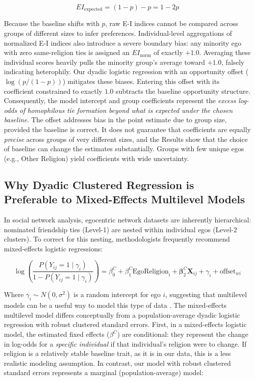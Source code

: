 \documentclass[11pt]{article}
\begin{document}
\begin{equation}
EI_{\text{expected}} = (1 - p) - p = 1 - 2p
\end{equation}

Because the baseline shifts with $p$, raw E-I indices cannot be compared across groups of different sizes to infer preferences. Individual-level aggregations of normalized E-I indices also introduce a severe boundary bias: any minority ego with zero same-religion ties is assigned an $EI_{\text{norm}}$ of exactly $+1.0$. Averaging these individual scores heavily pulls the minority group's average toward $+1.0$, falsely indicating heterophily. Our dyadic logistic regression with an opportunity offset ($\log(p/(1-p))$) mitigates these biases. Entering this offset with its coefficient constrained to exactly $1.0$ subtracts the baseline opportunity structure. Consequently, the model intercept and group coefficients represent the \textit{excess log-odds of homophilous tie formation beyond what is expected under the chosen baseline}. The offset addresses bias in the point estimate due to group size, provided the baseline is correct. It does not guarantee that coefficients are equally \textit{precise} across groups of very different sizes, and the Results show that the choice of baseline can change the estimates substantially. Groups with few unique egos (e.g., Other Religion) yield coefficients with wide uncertainty.

\subsection{Why Dyadic Clustered Regression is Preferable to Mixed-Effects Multilevel Models}

In social network analysis, egocentric network datasets are inherently hierarchical: nominated friendship ties (Level-1) are nested within individual egos (Level-2 clusters). To correct for this nesting, methodologists frequently recommend mixed-effects logistic regressions:

\begin{equation}
\log\left(\frac{P(Y_{ij} = 1 \mid \gamma_i)}{1 - P(Y_{ij} = 1 \mid \gamma_i)}\right) = \beta_0^C + \beta_1^C \text{EgoReligion}_i + \mathbf{\beta}_2^C \mathbf{X}_{ij} + \gamma_i + \text{offset}_{wi}
\end{equation}

Where $\gamma_i \sim N(0, \sigma^2)$ is a random intercept for ego $i$, suggesting that multilevel models can be a useful way to model this type of data \citep{snijders2003multilevel-9af}. The mixed-effects multilevel model differs conceptually from a population-average dyadic logistic regression with robust clustered standard errors. First, in a mixed-effects logistic model, the estimated fixed effects ($\beta^C$) are conditional: they represent the change in log-odds for a \textit{specific individual} if that individual's religion were to change. If religion is a relatively stable baseline trait, as it is in our data, this is a less realistic modeling assumption. In contrast, our model with robust clustered standard errors represents a marginal (population-average) model:
\end{document}
